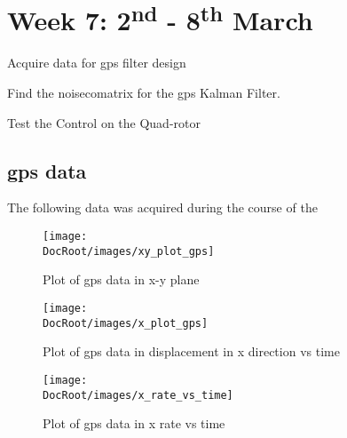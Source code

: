 \chapter{Week 7: 2\textsuperscript{nd} - 8\textsuperscript{th} March }

\begin{itemize*}
	\item Acquire  data for \gls{gps} filter design
	\item  Find the \gls{noisecomatrix} for the \gls{gps} Kalman Filter.
	\item Test the Control on the Quad-rotor
	
\end{itemize*}

 \tocless\section{\gls{gps} data}
The following data was acquired during the course of the 

						\begin{figure}[h!]
							\centering
							\texttt{[image: \\DocRoot/images/xy\_plot\_gps]}
							\caption{Plot of \gls{gps} data in x-y plane}
							\label{Fig: Plot of gps data in x-y plane}
						\end{figure}

						\begin{figure}[h!]
							\centering
							\texttt{[image: \\DocRoot/images/x\_plot\_gps]}
							\caption{Plot of \gls{gps} data in displacement in x direction vs time}
							\label{Fig: Plot of gps data in displacement in x direction vs time}
						\end{figure}

						\begin{figure}[h!]
							\centering
							\texttt{[image: \\DocRoot/images/x\_rate\_vs\_time]}
							\caption{Plot of \gls{gps} data in x rate vs time}
							\label{Fig: Plot of gps data in x rate vs time}
						\end{figure}


